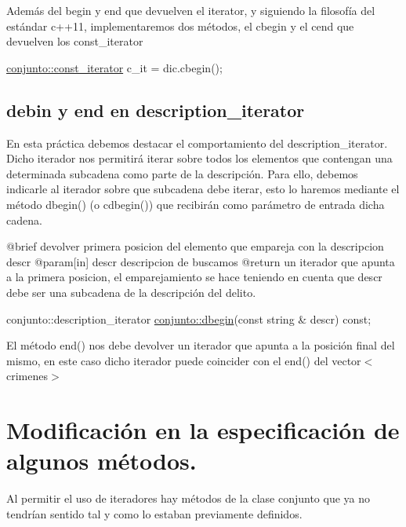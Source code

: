 Además del begin y end que devuelven el iterator, y siguiendo la filosofía del estándar c++11, implementaremos dos métodos, el cbegin y el cend que devuelven los const\+\_\+iterator


\begin{DoxyCode}
\hyperlink{classconjunto_1_1const__iterator}{conjunto::const\_iterator} c\_it = dic.cbegin();
\end{DoxyCode}
\hypertarget{index_descr}{}\subsection{debin y end en description\+\_\+iterator}\label{index_descr}
En esta práctica debemos destacar el comportamiento del description\+\_\+iterator. Dicho iterador nos permitirá iterar sobre todos los elementos que contengan una determinada subcadena como parte de la descripción. Para ello, debemos indicarle al iterador sobre que subcadena debe iterar, esto lo haremos mediante el método dbegin() (o cdbegin()) que recibirán como parámetro de entrada dicha cadena.


\begin{DoxyCode}
@brief devolver primera posicion del elemento que empareja con la descripcion descr
@param[in] descr descripcion de buscamos
@\textcolor{keywordflow}{return} un iterador que apunta a la primera posicion, el emparejamiento se hace teniendo en cuenta que 
      descr debe ser una subcadena de la descripción del delito.

conjunto::description\_iterator \hyperlink{classconjunto_ac40bafea5d9dc529c96cf0e5977100c6}{conjunto::dbegin}(\textcolor{keyword}{const} \textcolor{keywordtype}{string} & descr) \textcolor{keyword}{const};
\end{DoxyCode}


El método end() nos debe devolver un iterador que apunta a la posición final del mismo, en este caso dicho iterador puede coincider con el end() del vector$<$crimenes$>$\hypertarget{index_modif}{}\section{Modificación en la especificación de algunos métodos.}\label{index_modif}
Al permitir el uso de iteradores hay métodos de la clase conjunto que ya no tendrían sentido tal y como lo estaban previamente definidos.

